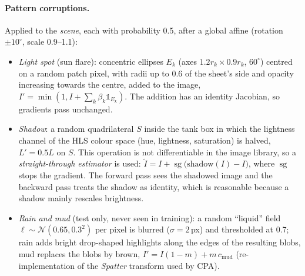 \documentclass[11pt,a4paper]{article}
\newcommand{\sg}{\operatorname{sg}}
\begin{document}
\paragraph{Pattern corruptions.} Applied to the \emph{scene}, each with probability 0.5, after a global affine (rotation $\pm10^\circ$, scale 0.9--1.1):
\begin{itemize}
  \item \emph{Light spot} (sun flare): concentric ellipses $E_k$ (axes $1.2r_k\times0.9r_k$, $60^\circ$) centred on a random patch pixel, with radii up to 0.6 of the sheet's side and opacity increasing towards the centre, added to the image, $I'=\min(1,I+\sum_k\beta_k\mathbb{1}_{E_k})$. The addition has an identity Jacobian, so gradients pass unchanged.
  \item \emph{Shadow}: a random quadrilateral $S$ inside the tank box in which the lightness channel of the HLS colour space (hue, lightness, saturation) is halved, $L'=0.5L$ on $S$. This operation is not differentiable in the image library, so a \emph{straight-through estimator} is used: $\tilde I=I+\sg\big(\mathrm{shadow}(I)-I\big)$, where $\sg$ stops the gradient. The forward pass sees the shadowed image and the backward pass treats the shadow as identity, which is reasonable because a shadow mainly rescales brightness.
  \item \emph{Rain and mud} (test only, never seen in training): a random ``liquid'' field $\ell\sim\mathcal{N}(0.65,0.3^2)$ per pixel is blurred ($\sigma=2$\,px) and thresholded at 0.7; rain adds bright drop-shaped highlights along the edges of the resulting blobs, mud replaces the blobs by brown, $I'=I(1-m)+m\,c_{\text{mud}}$ (re-implementation of the \emph{Spatter} transform used by CPA).
\end{itemize}
\end{document}
